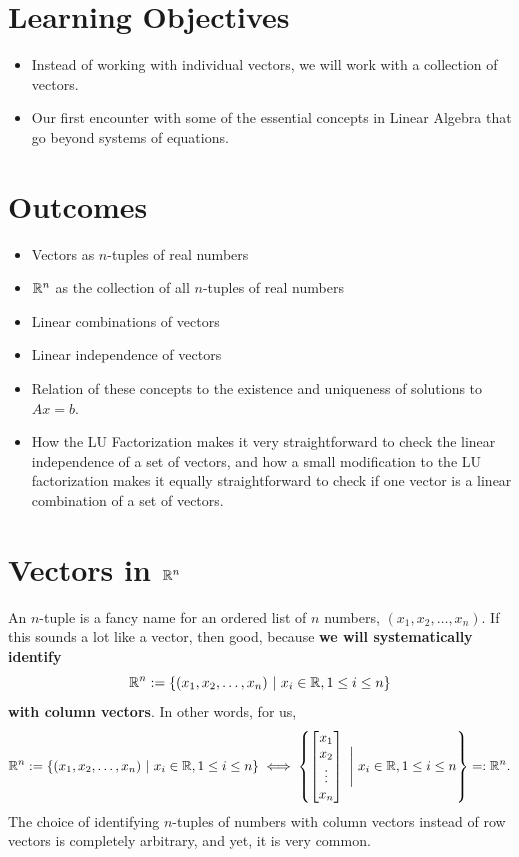\documentclass[letterpaper]{book}
\begin{document}
{\large 
\section*{Learning Objectives}
\begin{itemize}
\item Instead of working with individual vectors, we will work with a collection of vectors. 
\item Our first encounter with some of the essential concepts in Linear Algebra that go beyond systems of equations.
\end{itemize}

\section*{Outcomes}
\begin{itemize}
\item Vectors as $n$-tuples of real numbers
\item $\mathbb R^n$ as the collection of all $n$-tuples of real numbers
\item Linear combinations of vectors
\item Linear independence of vectors
\item Relation of these concepts to the existence and uniqueness of solutions to $Ax=b$.
\item How the LU Factorization makes it very straightforward to check the linear independence of a set of vectors, and how a small modification to the LU factorization makes it equally straightforward to check if one vector is a linear combination of a set of vectors. 
\end{itemize}
}

\section{Vectors in $\mathbb R^n$ }
An $n$-tuple is a fancy name for an ordered list of $n$ numbers, $(x_1, x_2, \ldots, x_n)$. If this sounds a lot like a vector, then good, because \textbf{we will systematically identify}
\begin{equation}
\mathbb R^n:=\{(x_1, x_2, \ldots, x_n)~|~x_i \in \mathbb R, 1\le i \le n \} 
\end{equation}
\textbf{with column vectors}. In other words, for us,
\begin{equation}
\mathbb R^n:=\{(x_1, x_2, \ldots, x_n)~|~x_i \in \mathbb R, 1\le i \le n \} \iff \left\{\begin{bmatrix} x_1 \\ x_2 \\ \vdots \\ x_n\end{bmatrix} ~\Bigg|~  x_i \in \mathbb R, 1\le i \le n \right\}=:\mathbb R^n.
\end{equation}
The choice of identifying $n$-tuples of numbers with column vectors instead of row vectors is completely arbitrary, and yet, it is very common.
\end{document}

